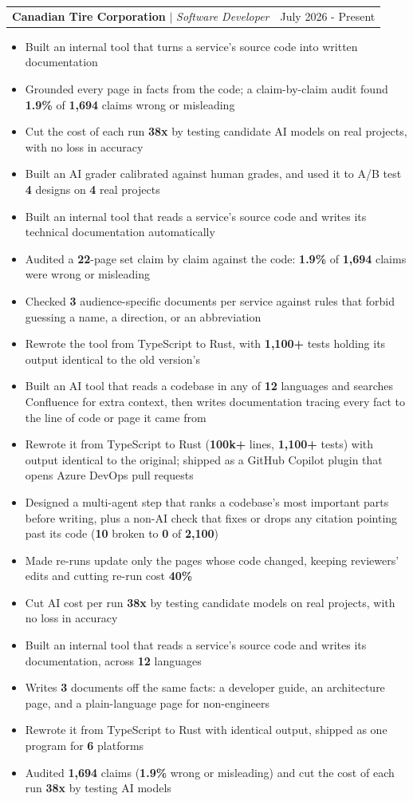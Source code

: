 \documentclass[letterpaper,10pt]{article}
\makeatletter
\newcommand{\resumeItem}[1]{
  \item\normalsize{
    {#1 \vspace{0pt}}
  }
}
\newcommand{\resumeSubheading}[3]{
    \item
    \begin{tabular*}{0.97\textwidth}[t]{l@{\extracolsep{\fill}}r}
      \textbf{#1} $|$ \textit{ #2} & #3 \\
    \end{tabular*}\vspace{-2pt}
}
\newcommand{\resumeItemListStart}{\begin{itemize}[topsep=2pt, itemsep=1pt, parsep=0pt, partopsep=0pt]}
\newcommand{\resumeItemListEnd}{\end{itemize}\vspace{0pt}}
\makeatother
\begin{document}
    \resumeSubheading{Canadian Tire Corporation}{Software Developer}{July 2026 - Present}
        \resumeItemListStart
            \ifdefined\flagAIML
            \resumeItem{Built an internal tool that turns a service's source code into written documentation}
            \resumeItem{Grounded every page in facts from the code; a claim-by-claim audit found \textbf{1.9\%} of \textbf{1,694} claims wrong or misleading}
            \resumeItem{Cut the cost of each run \textbf{38x} by testing candidate AI models on real projects, with no loss in accuracy}
            \resumeItem{Built an AI grader calibrated against human grades, and used it to A/B test \textbf{4} designs on \textbf{4} real projects}
            \else\ifdefined\flagQA
            \resumeItem{Built an internal tool that reads a service's source code and writes its technical documentation automatically}
            \resumeItem{Audited a \textbf{22}-page set claim by claim against the code: \textbf{1.9\%} of \textbf{1,694} claims were wrong or misleading}
            \resumeItem{Checked \textbf{3} audience-specific documents per service against rules that forbid guessing a name, a direction, or an abbreviation}
            \resumeItem{Rewrote the tool from TypeScript to Rust, with \textbf{1,100+} tests holding its output identical to the old version's}
            \else\ifdefined\flagSWE
            \resumeItem{Built an AI tool that reads a codebase in any of \textbf{12} languages and searches Confluence for extra context, then writes documentation tracing every fact to the line of code or page it came from}
            \resumeItem{Rewrote it from TypeScript to Rust (\textbf{100k+} lines, \textbf{1,100+} tests) with output identical to the original; shipped as a GitHub Copilot plugin that opens Azure DevOps pull requests}
            \resumeItem{Designed a multi-agent step that ranks a codebase's most important parts before writing, plus a non-AI check that fixes or drops any citation pointing past its code (\textbf{10} broken to \textbf{0} of \textbf{2,100})}
            \resumeItem{Made re-runs update only the pages whose code changed, keeping reviewers' edits and cutting re-run cost \textbf{40\%}}
            \resumeItem{Cut AI cost per run \textbf{38x} by testing candidate models on real projects, with no loss in accuracy}
            \else
            \resumeItem{Built an internal tool that reads a service's source code and writes its documentation, across \textbf{12} languages}
            \resumeItem{Writes \textbf{3} documents off the same facts: a developer guide, an architecture page, and a plain-language page for non-engineers}
            \resumeItem{Rewrote it from TypeScript to Rust with identical output, shipped as one program for \textbf{6} platforms}
            \resumeItem{Audited \textbf{1,694} claims (\textbf{1.9\%} wrong or misleading) and cut the cost of each run \textbf{38x} by testing AI models}
            \fi\fi\fi
        \resumeItemListEnd
\end{document}
